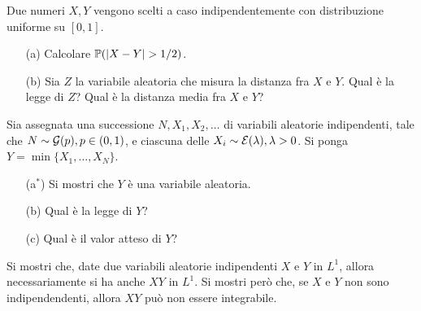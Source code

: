 \Esercizio{} %
Due numeri $X,Y$ vengono scelti a caso indipendentemente con distribuzione uniforme su $[0,1]$.
\begin{enumerate}
\item [(a)] Calcolare $\PP(|X-Y|>1/2)$.
\item [(b)] Sia $Z$ la variabile aleatoria che misura la distanza fra $X$ e $Y$. Qual è la legge di $Z$? Qual è la distanza media fra $X$ e $Y$?
\end{enumerate}

\Esercizio{} %
Sia assegnata una successione $N,X_1,X_2,\dots$ di variabili aleatorie indipendenti, tale che $N\sim\mathcal{G}(p), p\in(0,1)$, e ciascuna delle $X_i\sim\mathcal{E}(\lambda),\lambda>0$. Si ponga $Y=\min\{X_1,\dots,X_N  \}$.
\begin{enumerate}
\item [(a$^*$)] Si mostri che $Y$ è una variabile aleatoria.
\item [(b)] Qual è la legge di $Y$?
\item [(c)] Qual è il valor atteso di $Y$? 
\end{enumerate}

\Esercizio{} %
Si mostri che, date due variabili aleatorie indipendenti $X$ e $Y$ in $L^1$, allora necessariamente si ha anche $XY$ in $L^1$. Si mostri però che, se $X$ e $Y$ non sono indipendendenti, allora $XY$ può non essere integrabile.

